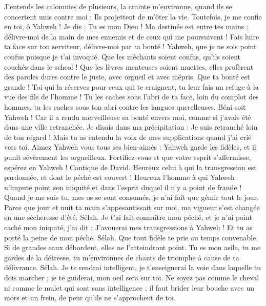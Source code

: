 \begin{multicols}{2}
J'entends les calomnies de plusieurs, la crainte m'environne, quand ils se concertent unis contre moi : Ils projettent de m'ôter la vie.
Toutefois, je me confie en toi, ô Yahweh ! Je dis : Tu es mon Dieu !
Ma destinée est entre tes mains ; délivre-moi de la main de mes ennemis et de ceux qui me poursuivent !
Fais luire ta face sur ton serviteur, délivre-moi par ta bonté !
Yahweh, que je ne sois point confus puisque je t'ai invoqué. Que les méchants soient confus, qu'ils soient couchés dans le scheol !
Que les lèvres menteuses soient muettes, elles profèrent des paroles dures contre le juste, avec orgueil et avec mépris.
Que ta bonté est grande ! Toi qui la réserves pour ceux qui te craignent, tu leur fais un refuge à la vue des fils de l'homme !
Tu les caches sous l'abri de ta face, loin du complot des hommes, tu les caches sous ton abri contre les langues querelleuses.
Béni soit Yahweh ! Car il a rendu merveilleuse sa bonté envers moi, comme si j'avais été dans une ville retranchée.
Je disais dans ma précipitation : Je suis retranché loin de ton regard ! Mais tu as entendu la voix de mes supplications quand j'ai crié vers toi.
Aimez Yahweh vous tous ses bien-aimés ; Yahweh garde les fidèles, et il punit sévèrement les orgueilleux.
Fortifiez-vous et que votre esprit s'affermisse, espérez en Yahweh !
\VerseOne{}Cantique de David. Heureux celui à qui la transgression est pardonnée, et dont le péché est couvert !
Heureux l'homme à qui Yahweh n'impute point son iniquité et dans l'esprit duquel il n'y a point de fraude !
Quand je me suis tu, mes os se sont consumés, je n'ai fait que gémir tout le jour.
Parce que jour et nuit ta main s'appesantissait sur moi, ma vigueur s'est changée en une sécheresse d'été. Sélah.
Je t'ai fait connaître mon péché, et je n'ai point caché mon iniquité, j'ai dit : J'avouerai mes transgressions à Yahweh ! Et tu as porté la peine de mon péché. Sélah.
Que tout fidèle te prie au temps convenable. Si de grandes eaux débordent, elles ne l'atteindront point.
Tu es mon asile, tu me gardes de la détresse, tu m'environnes de chants de triomphe à cause de ta délivrance. Sélah.
Je te rendrai intelligent, je t'enseignerai la voie dans laquelle tu dois marcher ; je te guiderai, mon oeil sera sur toi.
Ne soyez pas comme le cheval ni comme le mulet qui sont sans intelligence ; il faut brider leur bouche avec un mors et un frein, de peur qu'ils ne s'approchent de toi.

\end{multicols}
